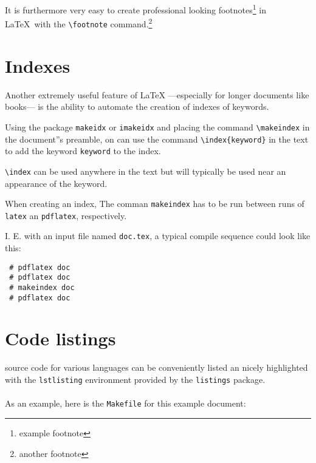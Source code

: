 \documentclass{article}
\begin{document}
It is furthermore very easy to create professional looking  footnotes\footnote{example footnote} in \LaTeX\ with the \verb+\footnote+ command.\footnote{another footnote}
 





\section{Indexes}

Another extremely useful feature of  {\LaTeX} ---especially for longer documents like books--- is the ability to automate the creation of indexes of keywords.

Using the package \verb+makeidx+ or \verb+imakeidx+ and placing the  command  \verb+\makeindex+ in the document''s preamble, on can use the command \verb+\index{keyword}+ in the text to add the keyword  \texttt{keyword} to the index.

\verb+\index+ can be used anywhere in the text but will typically be used near an  appearance of the keyword.

When creating an index,  The comman \verb+makeindex+ has to be run between runs of \verb+latex+ an \verb+pdflatex+, respectively.

I. E. with an input file named \verb+doc.tex+, a typical compile sequence could look like this:



\begin{lstlisting}
 # pdflatex doc
 # pdflatex doc
 # makeindex doc
 # pdflatex doc
\end{lstlisting}


\section{Code listings}

source code for various languages  can be conveniently listed an nicely highlighted with the \verb+lstlisting+ environment provided by the \verb+listings+ package.


 \paragraph{} As an example, here is the \verb+Makefile+ for this example document:
\end{document}
